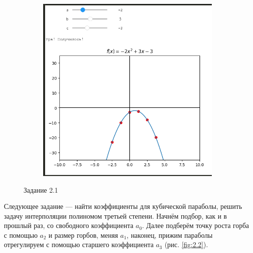 \documentclass[14pt,a4paper]{extarticle}
\begin{document}
\begin{figure}[h!]
\begin{subfigure}{.5\textwidth}
        \includegraphics[width=0.9\linewidth]{figures/2.1-second.png}
    \end{subfigure}

    \caption{Задание 2.1}
    \label{fig:2.1}
\end{figure}

        Следующее задание --- найти коэффициенты для кубической параболы,
решить задачу интерполяции полиномом третьей степени. Начнём подбор, как
и в прошлый раз, со свободного коэффициента $a_0$. Далее подберём точку роста
горба с помощью $a_2$ и размер горбов, меняя $a_1$, наконец, прижим параболы
отрегулируем с помощью старшего коэффициента $a_3$ (рис. \ref{fig:2.2}).
\end{document}
